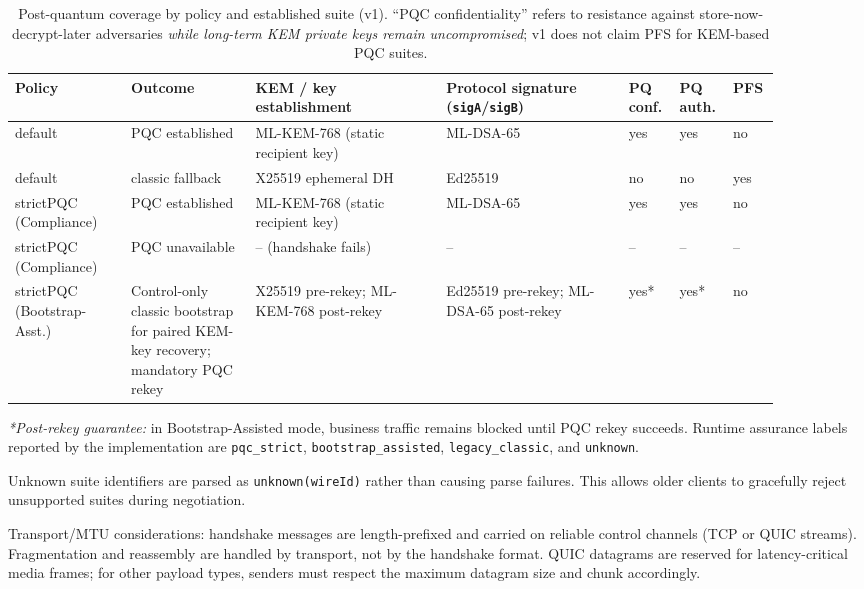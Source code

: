 \documentclass[10pt,journal,compsoc]{IEEEtran}
\begin{document}
\begin{table}[!tp]
\centering
\tiny
\setlength{\tabcolsep}{3pt}
\caption{Post-quantum coverage by policy and established suite (v1). ``PQC confidentiality'' refers to resistance against store-now-decrypt-later adversaries \emph{while long-term KEM private keys remain uncompromised}; v1 does not claim PFS for KEM-based PQC suites.}
\label{tab:supp-pqc-coverage}
\begin{tabular}{@{}
  >{\raggedright\arraybackslash}p{0.14\linewidth}
  >{\raggedright\arraybackslash}p{0.15\linewidth}
  >{\raggedright\arraybackslash}p{0.23\linewidth}
  >{\raggedright\arraybackslash}p{0.22\linewidth}
  >{\centering\arraybackslash}p{0.05\linewidth}
  >{\centering\arraybackslash}p{0.05\linewidth}
  >{\centering\arraybackslash}p{0.05\linewidth}@{}}
\toprule
Policy & Outcome & KEM / key establishment & Protocol signature (\texttt{sigA}/\texttt{sigB}) & PQ conf. & PQ auth. & PFS \\
\midrule
default & PQC established & ML-KEM-768 (static recipient key) & ML-DSA-65 & yes & yes & no \\
default & classic fallback & X25519 ephemeral DH & Ed25519 & no & no & yes \\
strictPQC (Compliance) & PQC established & ML-KEM-768 (static recipient key) & ML-DSA-65 & yes & yes & no \\
strictPQC (Compliance) & PQC unavailable & -- (handshake fails) & -- & -- & -- & -- \\
strictPQC (Bootstrap-Asst.) & Control-only classic bootstrap for paired KEM-key recovery; mandatory PQC rekey & X25519 pre-rekey; ML-KEM-768 post-rekey & Ed25519 pre-rekey; ML-DSA-65 post-rekey & yes* & yes* & no \\
\bottomrule
\end{tabular}
\end{table}

\noindent\textit{*Post-rekey guarantee:} in Bootstrap-Assisted mode,
business traffic remains blocked until PQC rekey succeeds. Runtime
assurance labels reported by the implementation are
\texttt{pqc\_strict}, \texttt{bootstrap\_assisted},
\texttt{legacy\_classic}, and \texttt{unknown}.

Unknown suite identifiers are parsed as \texttt{unknown(wireId)} rather
than causing parse failures. This allows older clients to gracefully
reject unsupported suites during negotiation.

Transport/MTU considerations: handshake messages are length-prefixed and
carried on reliable control channels (TCP or QUIC streams). Fragmentation
and reassembly are handled by transport, not by the handshake format.
QUIC datagrams are reserved for latency-critical media frames; for other
payload types, senders must respect the maximum datagram size and chunk
accordingly.
\end{document}
